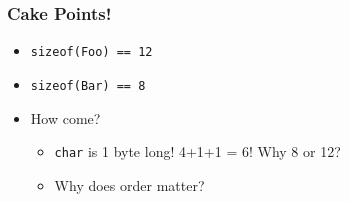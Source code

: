 \begin{frame}
  \frametitle{Cake Points!}
  \vskip-5mm
  \begin{itemize}
    \item \texttt{sizeof(Foo) == 12}
    \item \texttt{sizeof(Bar) == 8}
    \item How come?
          \begin{itemize}
            \item \texttt{char} is 1 byte long! 4+1+1 = 6! Why 8 or 12?
            \item Why does order matter?
          \end{itemize}
  \end{itemize}
\end{frame}




